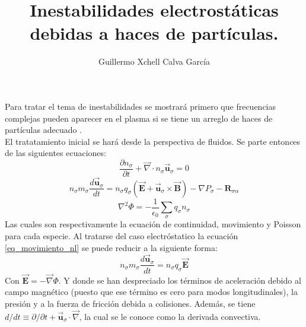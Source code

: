 \documentclass[12pt]{article}
\author{Guillermo Xchell Calva García}
\title{\textbf{Inestabilidades electrostáticas debidas a haces de partículas.}}
\date{}
\begin{document}
\maketitle
Para tratar el tema de inestabilidades se mostrará primero que frecuencias complejas pueden aparecer en el plasma si se tiene un arreglo de haces de partículas adecuado \cite{bellan2008fundamentals}.\\
El tratatamiento inicial se hará desde la perspectiva de fluidos. Se parte entonces de las siguientes ecuaciones:
\begin{equation}
\label{cont_nl}
\frac{\partial n_{\sigma}}{\partial t} + \overrightarrow{\nabla} \cdot n_{\sigma}\overrightarrow{\textbf{u}}_{\sigma}=0
\end{equation}
\begin{equation}
\label{eq_movimiento_nl}
n_{\sigma}m_{\sigma}\frac{d\overrightarrow{\textbf{u}}_{\sigma}}{dt}= n_{\sigma}q_{\sigma}(\overrightarrow{\textbf{E}} + \overrightarrow{\textbf{u}}_{\sigma} \times \overrightarrow{\textbf{B}}) - \nabla P_{\sigma} - \textbf{R}_{\sigma \alpha}
\end{equation}
\begin{equation}
\label{poisson_nl}
\nabla ^2 \Phi = -\frac{1}{\epsilon_0}\sum _{\sigma}q_{\sigma} n_{\sigma}
\end{equation}
Las cuales son respectivamente la ecuación de continuidad, movimiento y Poisson para cada especie. Al tratarse del caso electróstatico la ecuación \ref{eq_movimiento_nl} se puede reducir a la siguiente forma:
\begin{equation}
\label{eq_mov_simpl_nl}
n_{\sigma}m_{\sigma}\frac{d\overrightarrow{\textbf{u}}_{\sigma}}{dt}= n_{\sigma}q_{\sigma} \overrightarrow{\textbf{E}}
\end{equation}
Con $\overrightarrow{\textbf{E}} = - {\overrightarrow\nabla} \Phi$. Y donde se han despreciado los términos de aceleración debido al campo magnético (puesto que ese término es cero para modos longitudinales), la presión y a la fuerza de fricción debida a colisiones. Además, se tiene $d/dt \equiv \partial / \partial t + \overrightarrow{\textbf{u}}_{\sigma} \cdot \overrightarrow{\nabla}$, la cual se le conoce como la derivada convectiva.\\
\end{document}
